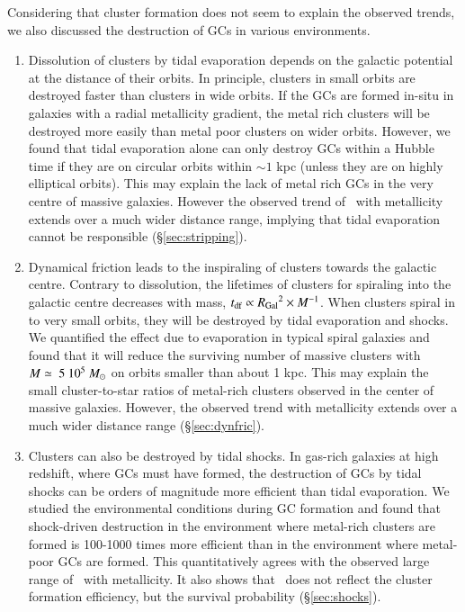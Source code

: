 \documentclass{aa}
\begin{document}
Considering that cluster formation does not seem to explain the observed trends, we also discussed the destruction of GCs in various environments.
\begin{enumerate}
\item[(iv)]  Dissolution of clusters by tidal evaporation depends on the galactic potential at the distance of their orbits. In principle, clusters in small orbits are destroyed faster than clusters in wide orbits. If the GCs are formed in-situ in galaxies with a radial metallicity gradient, the metal rich clusters will be destroyed more easily than metal poor clusters on wider orbits. However, we found that tidal evaporation alone can only destroy GCs within a Hubble time if they are on
circular orbits within $\sim1$ kpc (unless they are on highly elliptical orbits). This may explain the lack of metal rich GCs
in the very centre of massive galaxies. However the observed trend of \Rgcst\ with metallicity extends over a much wider  distance range, implying that tidal evaporation cannot be responsible (\S \ref{sec:stripping}).
\item[(v)]  Dynamical friction leads to the inspiraling of clusters towards the galactic centre. Contrary to dissolution, the lifetimes of clusters 
for spiraling into the galactic centre decreases with mass, $t_{\rm df} \propto \mbox{$R_{\rm Gal}$}^2\times M^{-1}$. When clusters spiral in to very small orbits, they will be destroyed by tidal evaporation and shocks. We quantified the effect due to evaporation in typical spiral galaxies and found that it will reduce the surviving number of massive clusters with $M \simeq\ 5~10^5~\mbox{$M_{\odot}$}$ on orbits smaller than about 1 kpc. This may explain the small cluster-to-star ratios of metal-rich clusters observed in the center of massive galaxies. However, the observed trend with metallicity extends over a much wider distance range (\S \ref{sec:dynfric}).
\item[(vi)] Clusters can also be destroyed by tidal shocks. In gas-rich galaxies at high redshift, where GCs must have formed, the destruction of GCs by tidal shocks can be orders of magnitude more efficient than tidal evaporation. We studied the environmental conditions during GC formation and found that shock-driven destruction in the environment where metal-rich clusters are formed is 100-1000 times more efficient than in the environment where metal-poor GCs are formed.
This quantitatively agrees with the observed large range of \Rgcst\ with metallicity. It also shows that \Rgcst\ does not reflect the cluster formation efficiency, but the survival probability (\S \ref{sec:shocks}).
\end{enumerate}
\end{document}
